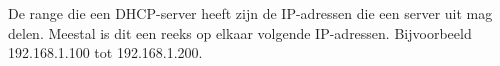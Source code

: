 De range die een DHCP-server heeft zijn de IP-adressen die een server uit mag delen. Meestal is dit een reeks op elkaar volgende IP-adressen. Bijvoorbeeld 192.168.1.100 tot 192.168.1.200. 
